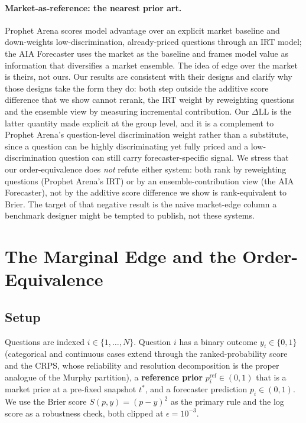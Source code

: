 \documentclass[11pt]{article}
\begin{document}
\paragraph{Market-as-reference: the nearest prior art.} Prophet Arena \citep{yang2025} scores model advantage over an explicit market baseline and down-weights low-discrimination, already-priced questions through an IRT model; the AIA Forecaster \citep{alur2025} uses the market as the baseline and frames model value as information that diversifies a market ensemble. The idea of edge over the market is theirs, not ours. Our results are consistent with their designs and clarify why those designs take the form they do: both step outside the additive score difference that we show cannot rerank, the IRT weight by reweighting questions and the ensemble view by measuring incremental contribution. Our $\Delta$LL is the latter quantity made explicit at the group level, and it is a complement to Prophet Arena's question-level discrimination weight rather than a substitute, since a question can be highly discriminating yet fully priced and a low-discrimination question can still carry forecaster-specific signal. We stress that our order-equivalence does \emph{not} refute either system: both rank by reweighting questions (Prophet Arena's IRT) or by an ensemble-contribution view (the AIA Forecaster), not by the additive score difference we show is rank-equivalent to Brier. The target of that negative result is the naive market-edge column a benchmark designer might be tempted to publish, not these systems.

\section{The Marginal Edge and the Order-Equivalence}
\label{sec:metric}

\subsection{Setup}
Questions are indexed $i \in \{1,\dots,N\}$. Question $i$ has a binary outcome $y_i \in \{0,1\}$ (categorical and continuous cases extend through the ranked-probability score and the CRPS, whose reliability and resolution decomposition \citep{hersbach2000} is the proper analogue of the Murphy partition), a \textbf{reference prior} $p^{\mathrm{ref}}_i \in (0,1)$ that is a market price at a pre-fixed snapshot $t^{*}$, and a forecaster prediction $p_i \in (0,1)$. We use the Brier score $S(p,y)=(p-y)^2$ as the primary rule and the log score as a robustness check, both clipped at $\epsilon=10^{-3}$.
\end{document}
